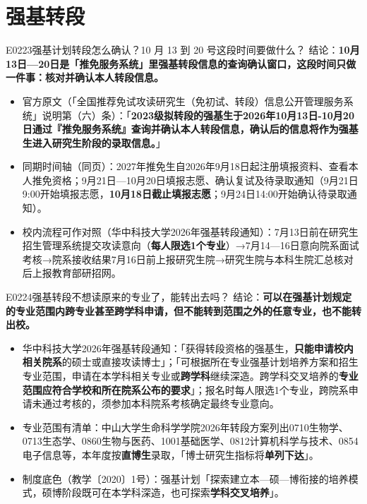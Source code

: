 \section{强基转段}
\begin{qa}{E0223}{强基计划转段怎么确认？10 月 13 到 20 号这段时间要做什么？}
结论：\textbf{10月13日—20日是「推免服务系统」里强基转段信息的查询确认窗口，这段时间只做一件事：核对并确认本人转段信息。}
\begin{itemize}
  \item 官方原文（「全国推荐免试攻读研究生（免初试、转段）信息公开管理服务系统」说明第（六）条）：「\textbf{2023级拟转段的强基生于2026年10月13日-10月20日通过『推免服务系统』查询并确认本人转段信息，确认后的信息将作为强基生进入研究生阶段的录取信息。}」
  \item 同期时间轴（同页）：2027年推免生自2026年9月18日起注册填报资料、查看本人推免资格；9月21日—10月20日填报志愿、确认复试及待录取通知（9月21日9:00开始填报志愿，\textbf{10月18日截止填报志愿}；9月24日14:00开始确认待录取通知）。
  \item 校内流程可作对照（华中科技大学2026年强基转段通知）：7月13日前在研究生招生管理系统提交攻读意向（\textbf{每人限选1个专业}）→7月14—16日意向院系面试考核→院系接收结果7月16日前上报研究生院→研究生院与本科生院汇总核对后上报教育部研招网。
\end{itemize}
\end{qa}

\begin{qa}{E0224}{强基转段不想读原来的专业了，能转出去吗？}
结论：\textbf{可以在强基计划规定的专业范围内跨专业甚至跨学科申请，但不能转到范围之外的任意专业，也不能转出校。}
\begin{itemize}
  \item 华中科技大学2026年强基转段通知：「获得转段资格的强基生，\textbf{只能申请校内相关院系}的硕士或直接攻读博士」；「可根据所在专业强基计划培养方案和招生专业范围，申请在本学科相关专业或\textbf{跨学科}继续深造。跨学科交叉培养的\textbf{专业范围应符合学校和所在院系公布的要求}」；报名时每人限选1个专业，跨院系申请未通过考核的，须参加本科院系考核确定最终专业意向。
  \item 专业范围有清单：中山大学生命科学学院2026年转段方案列出0710生物学、0713生态学、0860生物与医药、1001基础医学、0812计算机科学与技术、0854电子信息等，本年度按\textbf{直博生}录取，「博士研究生指标将\textbf{单列下达}」。
  \item 制度底色（教学〔2020〕1号）：强基计划「探索建立本—硕—博衔接的培养模式，硕博阶段既可在本学科深造，也可探索\textbf{学科交叉培养}」。
\end{itemize}
\end{qa}

